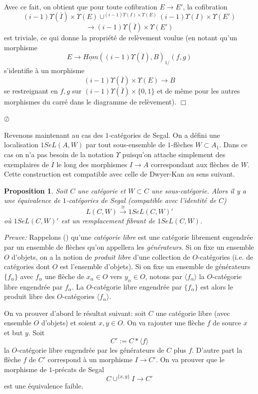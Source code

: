 \documentclass[12pt]{article}
\newcommand{\eop}{\hfill $\Box$\vspace{.1in}}
\newtheorem{proposition}[lemma]{Proposition}
\begin{document}
Avec ce fait, on obtient que pour toute cofibration $E\rightarrow E'$,
la cofibration
$$
(i-1)\Upsilon (\overline{I})\times \Upsilon (E) \cup ^{
(i-1)\Upsilon (I)\times \Upsilon (E)}
(i-1)\Upsilon (I)\times \Upsilon (E')
$$
$$
\rightarrow (i-1)\Upsilon (\overline{I})\times \Upsilon (E')
$$
est triviale, ce qui donne la propri\'et\'e de rel\`evement voulue
(en notant qu'un morphisme
$$
E\rightarrow \underline{Hom}((i-1)\Upsilon (\overline{I}),B)_{1/}(f,g)
$$
s'identifie \`a un morphisme
$$
(i-1)\Upsilon (\overline{I})\times \Upsilon (E)\rightarrow B
$$
se restreignant en $f,g$ sur $(i-1)\Upsilon (\overline{I})\times \{ 0,1\}$
et de m\^eme pour les autres morphismes du carr\'e dans le diagramme
de rel\`evement).
\eop


\noindent
$\oslash$

Revenons maintenant au cas des $1$-cat\'egories de Segal. On a d\'efini une
localisation $1SeL(A,W)$ par tout sous-ensemble de $1$-fl\`eches $W\subset A_1$.
Dans ce cas on n'a pas besoin de la notation $\Upsilon$ puisqu'on
attache simplement
des exemplaires de $\overline{I}$ le long des morphismes $I\rightarrow A$
correspondant aux fl\`eches de $W$. Cette construction est compatible
avec
celle de Dwyer-Kan au sens suivant.

\begin{proposition}
\label{dklocsegloc}
Soit $C$ une cat\'egorie et $W\subset C$ une sous-cat\'egorie.
Alors il y a une
\'equivalence de $1$-cat\'egories de Segal (compatible avec
l'identit\'e de
$C$)
$$
L(C,W) \stackrel{\cong}{\rightarrow} 1SeL(C,W)'
$$
o\`u $1SeL(C,W)'$ est un remplacement fibrant de
$1SeL(C,W)$.
\end{proposition}
{\em Preuve:}
Rappelons (\cite{DwyerKan1}) qu'une {\em cat\'egorie libre} est une cat\'egorie
librement engendr\'ee par un ensemble de fl\`eches qu'on appellera les {\em
g\'en\'erateurs}. Si on fixe un ensemble $O$ d'objets, on a la notion de {\em
produit libre} d'une collection de $O$-cat\'egories
(i.e. de cat\'egories dont $O$ est
l'ensemble d'objets). Si on fixe un ensemble de g\'en\'erateurs $\{
f_{\alpha}\}$ avec $f_{\alpha}$ une fl\`eche de $x_{\alpha}\in O$ vers
$y_{\alpha}\in O$, notons par $\langle f_{\alpha}\rangle$ la $O$-cat\'egorie
libre engendr\'ee par $f_{\alpha}$. La $O$-cat\'egorie libre engendr\'ee par
$\{ f_{\alpha}\}$ est alors le produit libre des $O$-cat\'egories
$\langle f_{\alpha}\rangle$.

On va prouver d'abord le r\'esultat suivant: soit $C$ une cat\'egorie libre
(avec ensemble $O$ d'objets) et
soient $x,y\in O$. On va rajouter une fl\`eche $f$ de source
$x$ et but $y$. Soit
$$
C':= C\ast \langle f\rangle
$$
la $O$-cat\'egorie libre engendr\'ee par les g\'en\'erateurs de $C$ plus $f$.
D'autre part la fl\`eche $f$ de $C'$ correspond \`a un morphisme
$I\rightarrow C'$. On va prouver que le morphisme de $1$-pr\'ecats de Segal
$$
C\cup ^{\{ x,y\} }I\rightarrow C'
$$
est une \'equivalence faible.
\end{document}
